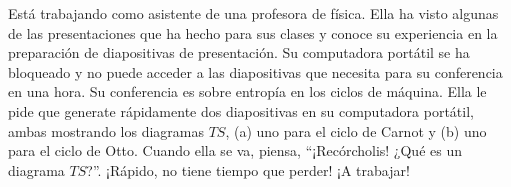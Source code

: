 \item Está trabajando como asistente de una profesora de física. Ella ha visto algunas de las presentaciones que ha hecho para sus clases y conoce su experiencia en la preparación de diapositivas de presentación. Su computadora portátil se ha bloqueado y no puede acceder a las diapositivas que necesita para su conferencia en una hora. Su conferencia es sobre entropía en los ciclos de máquina. Ella le pide que generate rápidamente dos diapositivas en su computadora portátil, ambas mostrando los diagramas $TS$, (a) uno para el ciclo de Carnot y (b) uno para el ciclo de Otto. Cuando ella se va, piensa, “¡Recórcholis! ¿Qué es un diagrama $TS$?”. ¡Rápido, no tiene tiempo que perder! ¡A trabajar!
